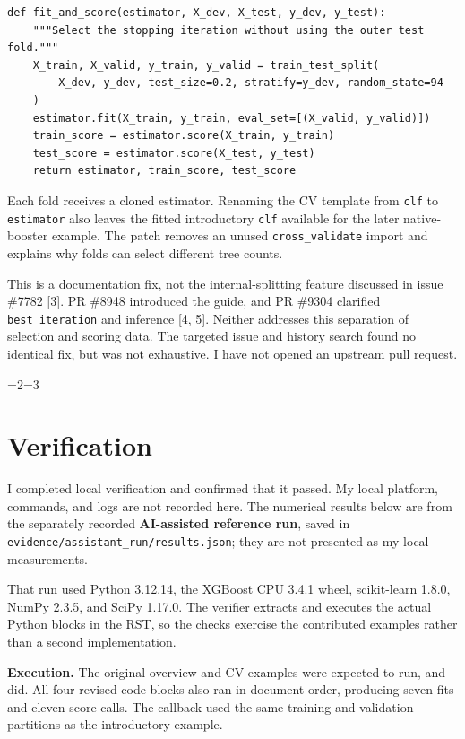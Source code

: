 \documentclass[10pt,letterpaper]{article}
\let\oldsection\section
\renewcommand{\section}{\ifnum\value{section}=2\clearpage\fi\ifnum\value{section}=3\clearpage\fi\oldsection}
\begin{document}
\begin{verbatim}
def fit_and_score(estimator, X_dev, X_test, y_dev, y_test):
    """Select the stopping iteration without using the outer test fold."""
    X_train, X_valid, y_train, y_valid = train_test_split(
        X_dev, y_dev, test_size=0.2, stratify=y_dev, random_state=94
    )
    estimator.fit(X_train, y_train, eval_set=[(X_valid, y_valid)])
    train_score = estimator.score(X_train, y_train)
    test_score = estimator.score(X_test, y_test)
    return estimator, train_score, test_score
\end{verbatim}

Each fold receives a cloned estimator. Renaming the CV template from
\texttt{clf} to \texttt{estimator} also leaves the fitted introductory
\texttt{clf} available for the later native-booster example. The patch
removes an unused \texttt{cross\_validate} import and explains why folds
can select different tree counts.

This is a documentation fix, not the internal-splitting feature
discussed in issue \#7782 {[}3{]}. PR \#8948 introduced the guide, and
PR \#9304 clarified \texttt{best\_iteration} and inference {[}4, 5{]}.
Neither addresses this separation of selection and scoring data. The
targeted issue and history search found no identical fix, but was not
exhaustive. I have not opened an upstream pull request.

\section{Verification}\label{verification}

I completed local verification and confirmed that it passed. My local
platform, commands, and logs are not recorded here. The numerical
results below are from the separately recorded \textbf{AI-assisted
reference run}, saved in \texttt{evidence/assistant\_run/results.json};
they are not presented as my local measurements.

That run used Python 3.12.14, the XGBoost CPU 3.4.1 wheel, scikit-learn
1.8.0, NumPy 2.3.5, and SciPy 1.17.0. The verifier extracts and executes
the actual Python blocks in the RST, so the checks exercise the
contributed examples rather than a second implementation.

\textbf{Execution.} The original overview and CV examples were expected
to run, and did. All four revised code blocks also ran in document
order, producing seven fits and eleven score calls. The callback used
the same training and validation partitions as the introductory example.
\end{document}
